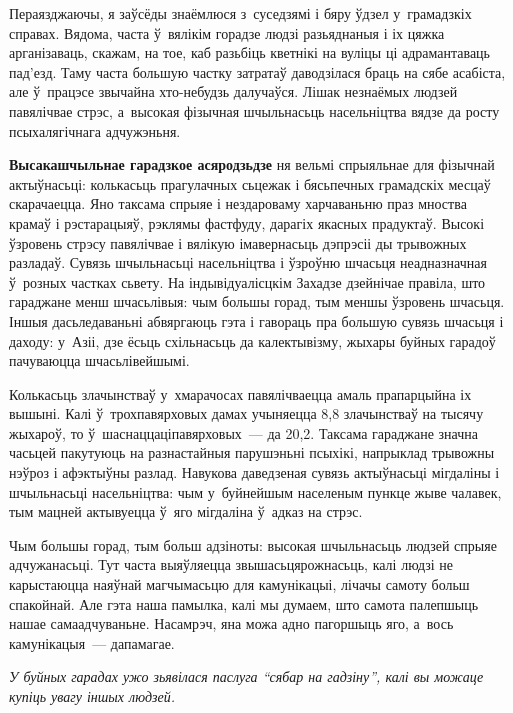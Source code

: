 Пераязджаючы, я заўсёды знаёмлюся з~суседзямі і бяру ўдзел у~грамадзкіх справах. Вядома, часта ў~вялікім горадзе людзі разьяднаныя і іх цяжка арганізаваць, скажам, на тое, каб разьбіць кветнікі на вуліцы ці адрамантаваць пад'езд. Таму часта большую частку затратаў даводзілася браць на сябе асабіста, але ў~працэсе звычайна хто-небудзь далучаўся. Лішак незнаёмых людзей павялічвае стрэс, а~высокая фізычная шчыльнасьць насельніцтва вядзе да росту псыхалягічнага адчужэньня.

\textbf{Высакашчыльнае гарадзкое асяродзьдзе} ня вельмі спрыяльнае для фізычнай актыўнасьці: колькасьць прагулачных сьцежак і бясьпечных грамадскіх месцаў скарачаецца. Яно таксама спрыяе і нездароваму харчаваньню праз мноства крамаў і рэстарацыяў, рэклямы фастфуду, дарагіх якасных прадуктаў. Высокі ўзровень стрэсу павялічвае і вялікую імавернасьць дэпрэсіі ды трывожных разладаў. Сувязь шчыльнасьці насельніцтва і ўзроўню шчасьця неадназначная ў~розных частках сьвету. На індывідуалісцкім Захадзе дзейнічае правіла, што гараджане менш шчасьлівыя: чым большы горад, тым меншы ўзровень шчасьця. Іншыя дасьледаваньні абвяргаюць гэта і гавораць пра большую сувязь шчасьця і даходу: у~Азіі, дзе ёсьць схільнасьць да калектывізму, жыхары буйных гарадоў пачуваюцца шчасьлівейшымі.

Колькасьць злачынстваў у~хмарачосах павялічваецца амаль прапарцыйна іх вышыні. Калі ў~трохпавярховых дамах учыняецца 8,8 злачынстваў на тысячу жыхароў, то ў~шаснаццаціпавярховых~--- да 20,2. Таксама гараджане значна часьцей пакутуюць на разнастайныя парушэньні псыхікі, напрыклад трывожны нэўроз і афэктыўны разлад. Навукова даведзеная сувязь актыўнасьці мігдаліны і шчыльнасьці насельніцтва: чым у~буйнейшым населеным пункце жыве чалавек, тым мацней актывуецца ў~яго мігдаліна ў~адказ на стрэс.


Чым большы горад, тым больш адзіноты: высокая шчыльнасьць людзей спрыяе адчужанасьці. Тут часта выяўляецца звышасьцярожнасьць, калі людзі не карыстаюцца наяўнай магчымасьцю для камунікацыі, лічачы самоту больш спакойнай. Але гэта наша памылка, калі мы думаем, што самота палепшыць нашае самаадчуваньне. Насамрэч, яна можа адно пагоршыць яго, а~вось камунікацыя~--- дапамагае.

\emph{У буйных гарадах ужо зьявілася паслуга ``сябар на гадзіну'', калі вы можаце купіць увагу іншых людзей.}

